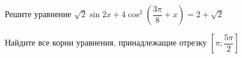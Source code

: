 \begin{ex}
	\begin{condition}
		\begin{enumcols}[label=\asbuk*)]
			\item Решите уравнение \(  \sqrt{2}\sin 2x + 4\cos^2{\left(  \dfrac{3\pi}{8}+ x \right)}=2 + \sqrt{2} \)
			\item Найдите все корни уравнения, принадлежащие отрезку \( \left[\pi;\dfrac{5\pi}{2}\right] \)
		\end{enumcols}
	\end{condition}
\end{ex}